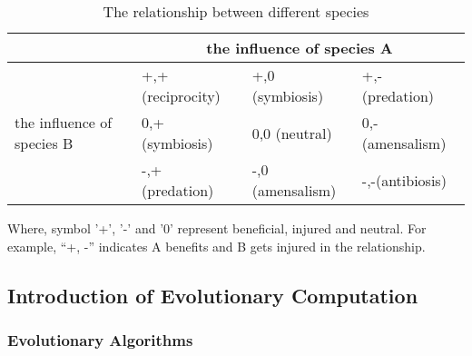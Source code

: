 \begin{table}[!t]          
  \centering                     
  \caption{The relationship between different species}
  \label{tab:relationship_species_coevolution} 
  \renewcommand{\arraystretch}{1.5}
  \begin{tabularx}{400pt}{l|l|l|l}                                                    
    \hline                                                                %
     & \multicolumn{3}{c}{the influence of species A } \\                       %
    \hline
    & +,+ (reciprocity)  & +,0 (symbiosis)   & +,- (predation)   \\
    the influence of species B & 0,+ (symbiosis) & 0,0 (neutral) & 0,- (amensalism)  \\
    & -,+ (predation)    & -,0 (amensalism) & -,-(antibiosis) \\
    \hline
  \end{tabularx}
\end{table}

Where, symbol '+', '-' and '0' represent beneficial, injured and neutral. For example, ``+, -'' indicates A benefits and B gets injured in the relationship.

\subsection{Introduction of Evolutionary Computation}\label{sec:intro_evolutionary_computation}

\subsubsection{Evolutionary Algorithms}


